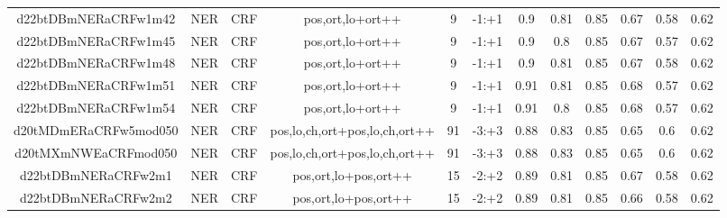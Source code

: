 \documentclass[a4paper]{article}
\begin{document}
\begin{landscape}
\begin{center}
\begin{tabular}{ |c|c|c|c|c|c|c|c|c|c|c|c|}
 	
 
 	
 		
 		\small{ d22btDBmNERaCRFw1m42 } & NER & CRF & pos,ort,lo+ort++  &  9 &  -1:+1  &  0.9 & 0.81 & 0.85  &  0.67 & 0.58 & 0.62 \\
 		

 	
 
 	
 		
 		\small{ d22btDBmNERaCRFw1m45 } & NER & CRF & pos,ort,lo+ort++  &  9 &  -1:+1  &  0.9 & 0.8 & 0.85  &  0.67 & 0.57 & 0.62 \\
 		

 	
 
 	
 		
 		\small{ d22btDBmNERaCRFw1m48 } & NER & CRF & pos,ort,lo+ort++  &  9 &  -1:+1  &  0.9 & 0.81 & 0.85  &  0.67 & 0.58 & 0.62 \\
 		

 	
 
 	
 		
 		\small{ d22btDBmNERaCRFw1m51 } & NER & CRF & pos,ort,lo+ort++  &  9 &  -1:+1  &  0.91 & 0.81 & 0.85  &  0.68 & 0.57 & 0.62 \\
 		

 	
 
 	
 		
 		\small{ d22btDBmNERaCRFw1m54 } & NER & CRF & pos,ort,lo+ort++  &  9 &  -1:+1  &  0.91 & 0.8 & 0.85  &  0.68 & 0.57 & 0.62 \\
 		

 	
 
 	
 		
 		\small{ d20tMDmERaCRFw5mod050 } & NER & CRF & pos,lo,ch,ort+pos,lo,ch,ort++  &  91 &  -3:+3  &  0.88 & 0.83 & 0.85  &  0.65 & 0.6 & 0.62 \\
 		

 	
 
 	
 		
 		\small{ d20tMXmNWEaCRFmod050 } & NER & CRF & pos,lo,ch,ort+pos,lo,ch,ort++  &  91 &  -3:+3  &  0.88 & 0.83 & 0.85  &  0.65 & 0.6 & 0.62 \\
 		

 	
 
 	
 		
 		\small{ d22btDBmNERaCRFw2m1 } & NER & CRF & pos,ort,lo+pos,ort++  &  15 &  -2:+2  &  0.89 & 0.81 & 0.85  &  0.67 & 0.58 & 0.62 \\
 		

 	
 
 	
 		
 		\small{ d22btDBmNERaCRFw2m2 } & NER & CRF & pos,ort,lo+pos,ort++  &  15 &  -2:+2  &  0.89 & 0.81 & 0.85  &  0.66 & 0.58 & 0.62 \\
 		


\end{tabular}
\end{center}
\end{landscape}
\end{document}
